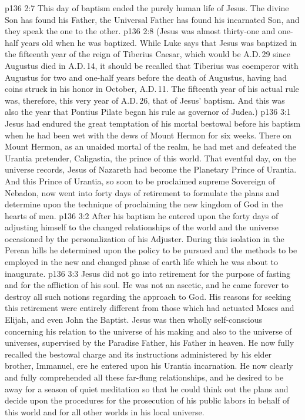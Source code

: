\vs p136 2:7 This day of baptism ended the purely human life of Jesus. The divine Son has found his Father, the Universal Father has found his incarnated Son, and they speak the one to the other.
\vs p136 2:8 \pc (Jesus was almost thirty\hyp{}one and one\hyp{}half years old when he was baptized. While Luke says that Jesus was baptized in the fifteenth year of the reign of Tiberius Caesar, which would be A.D.\,29 since Augustus died in A.D.\,14, it should be recalled that Tiberius was coemperor with Augustus for two and one\hyp{}half years before the death of Augustus, having had coins struck in his honor in October, A.D.\,11. The fifteenth year of his actual rule was, therefore, this very year of A.D.\,26, that of Jesus’ baptism. And this was also the year that Pontius Pilate began his rule as governor of Judea.)
\vs p136 3:1 Jesus had endured the great temptation of his mortal bestowal before his baptism when he had been wet with the dews of Mount Hermon for six weeks. There on Mount Hermon, as an unaided mortal of the realm, he had met and defeated the Urantia pretender, Caligastia, the prince of this world. That eventful day, on the universe records, Jesus of Nazareth had become the Planetary Prince of Urantia. And this Prince of Urantia, so soon to be proclaimed supreme Sovereign of Nebadon, now went into forty days of retirement to formulate the plans and determine upon the technique of proclaiming the new kingdom of God in the hearts of men.
\vs p136 3:2 After his baptism he entered upon the forty days of adjusting himself to the changed relationships of the world and the universe occasioned by the personalization of his Adjuster. During this isolation in the Perean hills he determined upon the policy to be pursued and the methods to be employed in the new and changed phase of earth life which he was about to inaugurate.
\vs p136 3:3 Jesus did not go into retirement for the purpose of fasting and for the affliction of his soul. He was not an ascetic, and he came forever to destroy all such notions regarding the approach to God. His reasons for seeking this retirement were entirely different from those which had actuated Moses and Elijah, and even John the Baptist. Jesus was then wholly self\hyp{}conscious concerning his relation to the universe of his making and also to the universe of universes, supervised by the Paradise Father, his Father in heaven. He now fully recalled the bestowal charge and its instructions administered by his elder brother, Immanuel, ere he entered upon his Urantia incarnation. He now clearly and fully comprehended all these far\hyp{}flung relationships, and he desired to be away for a season of quiet meditation so that he could think out the plans and decide upon the procedures for the prosecution of his public labors in behalf of this world and for all other worlds in his local universe.
